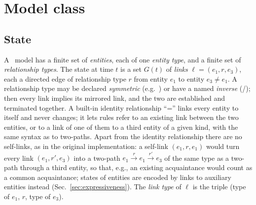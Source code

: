 \section{Model class}\label{sec:model}

\subsection{State}
A \tricl\ model has a finite set of \emph{entities}, each of one \emph{entity type}, and a finite set of \emph{relationship types}.
The state at time $t$ is a set $G(t)$ of \emph{links} $\ell = (e_1, r, e_3)$, each a directed edge of relationship type $r$ from entity $e_1$ to entity $e_3 \neq e_1$.
A relationship type may be declared \emph{symmetric} (e.g.\ ) or have a named \emph{inverse} (/); then every link implies its mirrored link, and the two are established and terminated together.
A built-in identity relationship ``='' links every entity to itself and never changes; it lets rules refer to an existing link between the two entities, or to a link of one of them to a third entity of a given kind, with the same syntax as to two-paths.
Apart from the identity relationship there are no self-links, as in the original implementation: a self-link $(e_1, r, e_1)$ would turn every link $(e_1, r', e_3)$ into a two-path $e_1 \xrightarrow{r} e_1 \xrightarrow{r'} e_3$ of the same type as a two-path through a third entity, so that, e.g., an existing acquaintance would count as a common acquaintance; states of entities are encoded by links to auxiliary entities instead (Sec.~\ref{sec:expressiveness}).
The \emph{link type} of $\ell$ is the triple (type of $e_1$, $r$, type of $e_3$).

